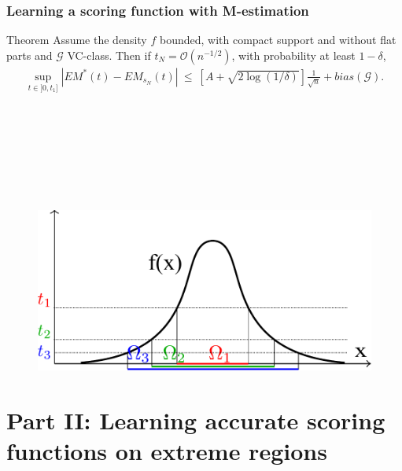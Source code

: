 \documentclass[9pt]{beamer}
\newcommand{\eg}{\emph{e.g.}{}}
\begin{document}
\begin{frame}
\frametitle{Learning a scoring function with M-estimation}

\begin{block}{Theorem}
Assume the density $f$ bounded, with compact support and without flat parts and $\mathcal{G}$ VC-class.
Then if $t_N = \mathcal{O}(n^{-1/2})$, with probability at least $1-\delta$, %
\begin{align*}
\sup_{t \in ]0,t_1]}|EM^*(t)-EM_{s_N}(t)| ~\le~ \left[A+\sqrt{2\log(1/\delta)}\right]\frac{1}{\sqrt n}+ bias(\mathcal{G}). %
\end{align*}
\end{block}
~\\~\\~\\~\\~\\~\\
\begin{figure}
\includegraphics[width=0.5\linewidth]{sourcefigs/em_optim.pdf}
\end{figure}

\end{frame}


\section{Part II: Learning accurate scoring functions on extreme regions}



\end{document}
